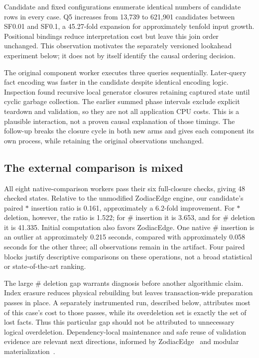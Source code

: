 Candidate and fixed configurations enumerate identical numbers of candidate
rows in every case. Q5 increases from 13,739 to 621,901 candidates between
SF0.01 and SF0.1, a 45.27-fold expansion for approximately tenfold input growth.
Positional bindings reduce interpretation cost but leave this join order
unchanged. This observation motivates the separately versioned lookahead
experiment below; it does not by itself identify the causal ordering decision.

The original component worker executes three queries sequentially. Later-query
fact encoding was faster in the candidate despite identical encoding logic.
Inspection found recursive local generator closures retaining captured state
until cyclic garbage collection. The earlier summed phase intervals exclude
explicit teardown and validation, so they are not all application CPU costs.
This is a plausible interaction, not a proven causal explanation of those
timings. The follow-up breaks the closure cycle in both new arms and gives each
component its own process, while retaining the original observations unchanged.

\subsection{The external comparison is mixed}
All eight native-comparison workers pass their six full-closure checks, giving
48 checked states. Relative to the unmodified ZodiacEdge engine, our candidate's
paired $*$ insertion ratio is 0.161, approximately a 6.2-fold improvement.
For $*$ deletion, however, the ratio is 1.522; for $\#$ insertion it is 3.653,
and for $\#$ deletion it is 41.335. Initial computation also favors ZodiacEdge.
One native $\#$ insertion is an outlier at approximately 0.215 seconds, compared
with approximately 0.058 seconds for the other three; all observations remain
in the artifact. Four paired blocks justify descriptive comparisons on these
operations, not a broad statistical or state-of-the-art ranking.

The large $\#$ deletion gap warrants diagnosis before another algorithmic claim.
Index erasure reduces physical rebuilding but leaves transaction-wide
preparation passes in place. A separately instrumented run, described below,
attributes most of this case's cost to those passes, while its overdeletion
set is exactly the set of lost facts. Thus this particular gap should not be
attributed to unnecessary logical overdeletion. Dependency-local maintenance
and safe reuse of validation evidence are relevant next directions, informed
by ZodiacEdge~\cite{xu2023} and modular materialization~\cite{hu2022modular}.


